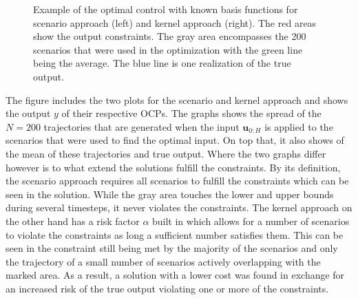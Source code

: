 \begin{figure}[htb]
{
 }
\caption{Example of the optimal control with known basis functions for scenario approach (left) and kernel approach (right). The red areas show the output constraints. The gray area encompasses the 200 scenarios that were used in the optimization with the green line being the average. The blue line is one realization of the true output.}
\label{ScenarioKernelComparison}
\end{figure}



The figure includes the two plots for the scenario and kernel approach and shows the output $y$ of their respective OCPs. The graphs shows the spread of the $N = 200$ trajectories that are generated when the input $\boldsymbol{u}_{0:H}$ is applied to the scenarios that were used to find the optimal input. On top that, it also shows of the mean of these trajectories and true output. Where the two graphs differ however is to what extend the solutions fulfill the constraints. By its definition, the scenario approach requires all scenarios to fulfill the constraints which can be seen in the solution. While the gray area touches the lower and upper bounds during several timesteps, it never violates the constraints. The kernel approach on the other hand has a risk factor $\alpha$ built in which allows for a number of scenarios to violate the constraints as long a sufficient number satisfies them. This can be seen in the constraint still being met by the majority of the scenarios and only the trajectory of a small number of scenarios actively overlapping with the marked area. As a result, a solution with a lower cost was found in exchange for an increased risk of the true output violating one or more of the constraints.





